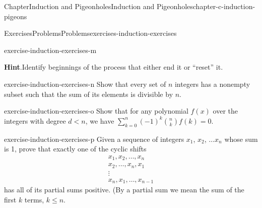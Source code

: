 \documentclass[oneside,10pt,]{book}
\newcommand{\blocktitlefont}{\relax}
\numberwithin{equation}{section}
\newcommand{\lt}{<}
\begin{document}
\begin{chapterptx}{Chapter}{Induction and Pigeonholes}{}{Induction and Pigeonholes}{}{}{chapter-c-induction-pigeons}
\begin{exercises-section}{Exercises}{Problems}{}{Problems}{}{}{exercises-induction-exercises}
\begin{divisionexercise}{12}{}{}{exercise-induction-exercises-m}
\par\smallskip%
\noindent\textbf{\blocktitlefont Hint}.\hypertarget{hint-induction-exercises-m-b}{}\quad{}Identify beginnings of the process that either end it or ``reset'' it.%
\end{divisionexercise}%
\begin{divisionexercise}{13}{}{}{exercise-induction-exercises-n}%
Show that every set of \(n\) integers has a nonempty subset such that the sum of its elements is divisible by \(n\).%
\end{divisionexercise}%
\begin{divisionexercise}{14}{}{}{exercise-induction-exercises-o}%
%
Show that for any polynomial \(f(x)\) over the integers with degree \(d\lt n\), we have \(\sum_{k=0}^{n} (-1)^k \binom{n}{k} f(k) = 0\).%
\end{divisionexercise}%
\begin{divisionexercise}{15}{}{}{exercise-induction-exercises-p}%
Given a sequence of integers \(x_1\), \(x_2\), \(\dots x_n\) whose sum is 1, prove that exactly one of the cyclic shifts%
\begin{gather*}
x_1,x_2,\dots ,x_n \\
x_2,\dots,x_n,x_1  \\
\vdots    \\
x_n,x_1,\dots,x_{n-1}  
\end{gather*}
has all of its partial sums positive. (By a partial sum we mean the sum of the first \(k\) terms, \(k \leq  n\).%
\end{divisionexercise}%
\end{exercises-section}
\end{chapterptx}
%
%
\typeout{************************************************}
\typeout{************************************************}
%
\end{document}

